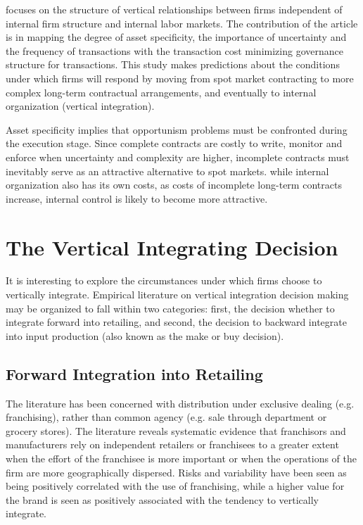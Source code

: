 \documentclass[12pt]{article}
\begin{document}
\cite{Williamson1979} focuses on the structure of vertical relationships between firms independent of internal firm structure and internal labor markets. The contribution of the \cite{Williamson1979} article is in mapping the degree of asset specificity, the importance of uncertainty and the frequency of transactions with the transaction cost minimizing governance structure for transactions. This study makes predictions about the conditions under which firms will respond by moving from spot market contracting to more complex long-term contractual arrangements, and eventually to internal organization (vertical integration).

Asset specificity implies that opportunism problems must be confronted during the execution stage. Since complete contracts are costly to write, monitor and enforce when uncertainty and complexity are higher, incomplete contracts must inevitably serve as an attractive alternative to spot markets. while internal organization also has its own costs, as costs of incomplete long-term contracts increase, internal control is likely to become more attractive.

\section{The Vertical Integrating Decision}
It is interesting to explore the circumstances under which firms choose to vertically integrate. Empirical literature on vertical integration decision making may be organized to fall within two categories: first, the decision whether to integrate forward into retailing, and second, the decision to backward integrate into input production (also known as the make or buy decision).
\subsection{Forward Integration into Retailing}
The literature has been concerned with distribution under exclusive dealing (e.g. franchising), rather than common agency (e.g. sale through department or grocery stores). The literature reveals systematic evidence that franchisors and manufacturers rely on independent retailers or franchisees to a greater extent when the effort of the franchisee is more important or when the operations of the firm are more geographically dispersed. Risks and variability have been seen as being positively correlated with the use of franchising, while a higher value for the brand is seen as positively associated with the tendency to vertically integrate.
\end{document}
